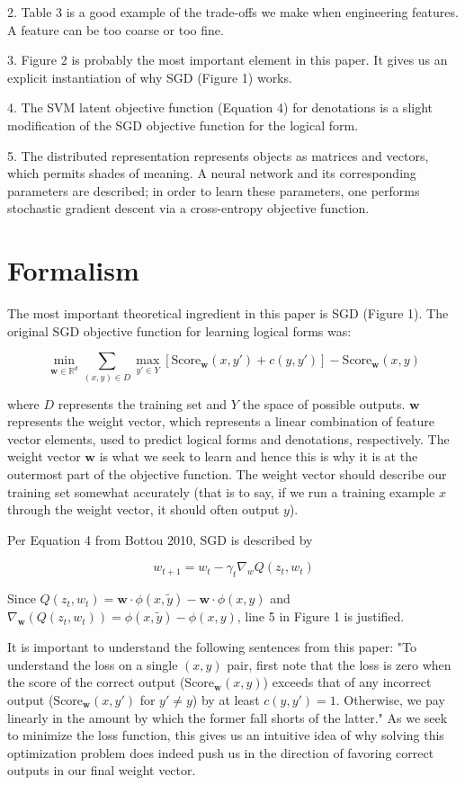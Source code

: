 \documentclass[twoside]{article}
\theoremstyle{definition}
\theoremstyle{definition}
\theoremstyle{remark}
\def\R{{\mathbb R}}
\begin{document}
2. Table 3 is a good example of the trade-offs we make when engineering features. A feature
can be too coarse or too fine.

3. Figure 2 is probably the most important element in this paper. It gives us an explicit
instantiation of why SGD (Figure 1) works.

4. The SVM latent objective function (Equation 4) for denotations 
is a slight modification of the SGD objective function for the logical form.

5. The distributed representation represents objects as matrices and vectors, which
permits shades of meaning. A neural network and its corresponding parameters are described;
in order to learn these parameters, one performs stochastic gradient descent via
a cross-entropy objective function.

\section{Formalism}

The most important theoretical ingredient in this paper is SGD (Figure 1). 
The original SGD objective function for learning logical forms was: 

\[
  \min_{\textbf{w} \in \R^d} \sum_{(x,y) \in D} \max_{y' \in Y}[\textrm{Score}_{\textbf{w}}(x,y') + c(y,y')] - \textrm{Score}_{\textbf{w}}(x,y)
\]

where $D$ represents the training set and $Y$ the space of possible outputs. $\textbf{w}$
represents the weight vector, which represents a linear combination of feature
vector elements, used to predict logical forms and denotations, respectively. The weight
vector $\textbf{w}$ is what we seek to learn and hence this is why it is at the
outermost part of the objective function. The weight vector should describe our
training set somewhat accurately (that is to say, if we run a training example $x$ through
the weight vector, it should often output $y$).

Per Equation 4 from Bottou 2010,  SGD is described by 

\[
 w_{t+1} = w_t - \gamma_t \nabla_w Q(z_t, w_t)
\]

Since $Q(z_t, w_t) = \textbf{w} \cdot \phi(x,\tilde{y}) - \textbf{w} \cdot \phi(x,y)$ and
$\nabla_{\textbf{w}}(Q(z_t, w_t)) = \phi(x, \tilde{y}) - \phi(x,y)$, line 5 in 
Figure 1 is justified.


It is important to understand the following sentences from this paper: "To understand the
loss on a single $(x,y)$ pair, first note that the loss is zero when the score of the
correct output ($\textrm{Score}_{\textbf{w}}(x,y)$) exceeds that of any incorrect output 
($\textrm{Score}_{\textbf{w}}(x,y')$ for $y' \neq y$) by at least $c(y,y') = 1$. Otherwise,
we pay linearly in the amount by which the former fall shorts of the latter." As we seek
to minimize the loss function, this gives us an intuitive idea of why solving this
optimization problem does indeed push us in the direction of favoring correct outputs
in our final weight vector.
\end{document}
